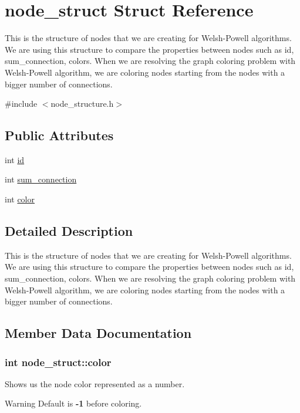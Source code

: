 \hypertarget{structnode__struct}{}\section{node\+\_\+struct Struct Reference}
\label{structnode__struct}


This is the structure of nodes that we are creating for Welsh-\/\+Powell algorithms. We are using this structure to compare the properties between nodes such as id, sum\+\_\+connection, colors. When we are resolving the graph coloring problem with Welsh-\/\+Powell algorithm, we are coloring nodes starting from the nodes with a bigger number of connections.  




{\ttfamily \#include $<$node\+\_\+structure.\+h$>$}

\subsection*{Public Attributes}
\begin{DoxyCompactItemize}
\item 
int \hyperlink{structnode__struct_aad2827c7c2c957838445ff15ccc5a7f9}{id}
\item 
int \hyperlink{structnode__struct_aed6e2d1b4c5803f06fce262251d5aa40}{sum\+\_\+connection}
\item 
int \hyperlink{structnode__struct_a664de0d14e58986a763fa46ce06ea642}{color}
\end{DoxyCompactItemize}


\subsection{Detailed Description}
This is the structure of nodes that we are creating for Welsh-\/\+Powell algorithms. We are using this structure to compare the properties between nodes such as id, sum\+\_\+connection, colors. When we are resolving the graph coloring problem with Welsh-\/\+Powell algorithm, we are coloring nodes starting from the nodes with a bigger number of connections. 

\subsection{Member Data Documentation}
\subsubsection[{\texorpdfstring{color}{color}}]{\setlength{\rightskip}{0pt plus 5cm}int node\+\_\+struct\+::color}\hypertarget{structnode__struct_a664de0d14e58986a763fa46ce06ea642}{}\label{structnode__struct_a664de0d14e58986a763fa46ce06ea642}
Shows us the node color represented as a number. \begin{DoxyWarning}{Warning}
Default is {\bfseries -\/1} before coloring. 
\end{DoxyWarning}
